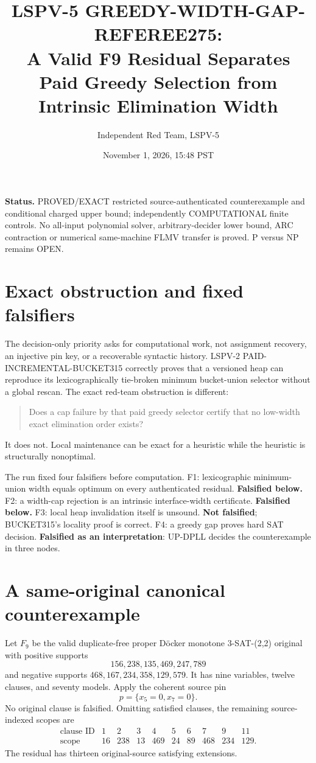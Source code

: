 \documentclass[11pt]{article}
\title{LSPV-5 GREEDY-WIDTH-GAP-REFEREE275:\\A Valid F9 Residual Separates Paid Greedy Selection from Intrinsic Elimination Width}
\author{Independent Red Team, LSPV-5}
\date{November 1, 2026, 15:48 PST}
\begin{document}
\maketitle

\noindent\textbf{Status.} PROVED/EXACT restricted source-authenticated counterexample and conditional charged upper bound; independently COMPUTATIONAL finite controls. No all-input polynomial solver, arbitrary-decider lower bound, ARC contraction or numerical same-machine FLMV transfer is proved. P versus NP remains OPEN.

\section{Exact obstruction and fixed falsifiers}
The decision-only priority asks for computational work, not assignment recovery, an injective pin key, or a recoverable syntactic history.  LSPV-2 PAID-INCREMENTAL-BUCKET315 correctly proves that a versioned heap can reproduce its lexicographically tie-broken minimum bucket-union selector without a global rescan.  The exact red-team obstruction is different:
\begin{quote}
Does a cap failure by that paid greedy selector certify that no low-width exact elimination order exists?
\end{quote}
It does not.  Local maintenance can be exact for a heuristic while the heuristic is structurally nonoptimal.

The run fixed four falsifiers before computation.  F1: lexicographic minimum-union width equals optimum on every authenticated residual.  \textbf{Falsified below.} F2: a width-cap rejection is an intrinsic interface-width certificate.  \textbf{Falsified below.} F3: local heap invalidation itself is unsound.  \textbf{Not falsified}; BUCKET315's locality proof is correct. F4: a greedy gap proves hard SAT decision. \textbf{Falsified as an interpretation}: UP-DPLL decides the counterexample in three nodes.

\section{A same-original canonical counterexample}
Let $F_9$ be the valid duplicate-free proper D\"ocker monotone 3-SAT-(2,2) original with positive supports
\[
156,238,135,469,247,789
\]
and negative supports $468,167,234,358,129,579$.  It has nine variables, twelve clauses, and seventy models.  Apply the coherent source pin
\[
p=\{x_5=0,x_7=0\}.
\]
No original clause is falsified.  Omitting satisfied clauses, the remaining source-indexed scopes are
\[
\begin{array}{c|ccccccccc}
\text{clause ID}&1&2&3&4&5&6&7&9&11\\\hline
\text{scope}&16&238&13&469&24&89&468&234&129.
\end{array}
\]
The residual has thirteen original-source satisfying extensions.
\end{document}
